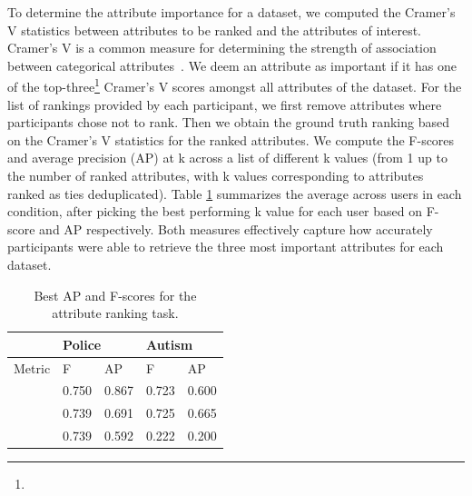  To determine the attribute importance for a dataset, we computed the Cramer's V statistics between attributes to be ranked and the attributes of interest. Cramer's V is a common measure for determining the strength of association between categorical attributes~\cite{McHugh2013}. We deem an attribute as important if it has one of the top-three\footnote{} Cramer's V scores amongst all attributes of the dataset. For the list of rankings provided by each participant, we first remove attributes where participants chose not to rank. Then we obtain the ground truth ranking based on the Cramer's V statistics for the ranked attributes. We compute the F-scores and average precision (AP) at k across a list of different k values (from 1 up to the number of ranked attributes, with k values corresponding to attributes ranked as ties deduplicated). Table \ref{table:ranking_results} summarizes the average across users in each condition, after picking the best performing k value for each user based on F-score and AP respectively. Both measures effectively capture how accurately participants were able to retrieve the three most important attributes for each dataset.
\begin{table}[ht!]
	\centering
	\begin{tabular}{|l|l|l|l|l|}
	\hline
	         & \multicolumn{2}{l|}{Police}                                   & \multicolumn{2}{l|}{Autism}                                   \\ \hline
	Metric   & F                             & AP                            & F                             & AP                            \\ \hline
	\system  & \cellcolor{blue!25}0.750 & \cellcolor{blue!25}0.867 & 0.723                         & 0.600                         \\ \hline
	\cluster & 0.739                         & 0.691                         & \cellcolor{blue!25}0.725 & \cellcolor{blue!25}0.665 \\ \hline
	\BFS     & 0.739                         & 0.592                         & 0.222                         & 0.200                         \\ \hline
	\end{tabular}
	\caption{Best AP and F-scores for the attribute ranking task.}
	\vspace{-10pt}
    \label{table:ranking_results}
\end{table}
